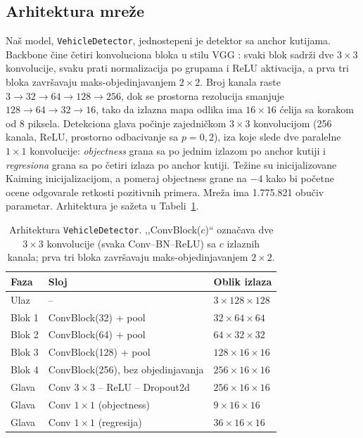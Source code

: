 \documentclass[11pt,a4paper]{article}
\begin{document}
\subsection{Arhitektura mreže}

Naš model, \texttt{VehicleDetector}, jednostepeni je detektor sa anchor
kutijama. Backbone čine četiri konvoluciona bloka u stilu VGG
\cite{simonyan2015vgg}: svaki blok sadrži dve $3\times3$ konvolucije, svaku
prati normalizacija po grupama \cite{ioffe2015batchnorm} i ReLU aktivacija, a
prva tri bloka završavaju maks-objedinjavanjem $2\times2$. Broj kanala raste
$3 \to 32 \to 64 \to 128 \to 256$, dok se prostorna rezolucija smanjuje
$128 \to 64 \to 32 \to 16$, tako da izlazna mapa odlika ima $16\times16$
ćelija sa korakom od 8 piksela. Detekciona glava počinje zajedničkom
$3\times3$ konvolucijom (256 kanala, ReLU, prostorno odbacivanje
\cite{srivastava2014dropout} sa $p=0{,}2$), iza koje slede dve paralelne
$1\times1$ konvolucije: \emph{objectness} grana sa po jednim izlazom po anchor
kutiji i \emph{regresiona} grana sa po četiri izlaza po anchor kutiji.
Težine su inicijalizovane Kaiming inicijalizacijom, a pomeraj objectness
grane na $-4$ kako bi početne ocene odgovarale retkosti pozitivnih primera.
Mreža ima 1.775.821 obučiv parametar. Arhitektura je sažeta u
Tabeli~\ref{tab:arch}.

\begin{table}[ht]
\centering
\caption{Arhitektura \texttt{VehicleDetector}. ,,ConvBlock($c$)`` označava dve
$3\times3$ konvolucije (svaka Conv--BN--ReLU) sa $c$ izlaznih kanala; prva tri
bloka završavaju maks-objedinjavanjem $2\times2$.}
\label{tab:arch}
\begin{tabular}{lll}
\toprule
\textbf{Faza} & \textbf{Sloj} & \textbf{Oblik izlaza} \\
\midrule
Ulaz   & --                                    & $3 \times 128 \times 128$ \\
Blok 1 & ConvBlock(32) + pool                  & $32 \times 64 \times 64$ \\
Blok 2 & ConvBlock(64) + pool                  & $64 \times 32 \times 32$ \\
Blok 3 & ConvBlock(128) + pool                 & $128 \times 16 \times 16$ \\
Blok 4 & ConvBlock(256), bez objedinjavanja    & $256 \times 16 \times 16$ \\
Glava  & Conv $3\times3$ -- ReLU -- Dropout2d  & $256 \times 16 \times 16$ \\
Glava  & Conv $1\times1$ (objectness)          & $9 \times 16 \times 16$ \\
Glava  & Conv $1\times1$ (regresija)           & $36 \times 16 \times 16$ \\
\bottomrule
\end{tabular}
\end{table}
\end{document}
